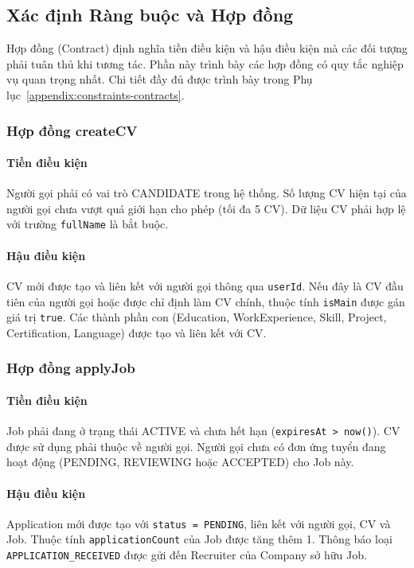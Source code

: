 \subsection{Xác định Ràng buộc và Hợp đồng}
\label{subsec:constraints-contracts}

Hợp đồng (Contract) định nghĩa tiền điều kiện và hậu điều kiện mà các đối tượng phải tuân thủ khi tương tác. Phần này trình bày các hợp đồng có quy tắc nghiệp vụ quan trọng nhất. Chi tiết đầy đủ được trình bày trong Phụ lục~\ref{appendix:constraints-contracts}.

\subsubsection{Hợp đồng createCV}

\paragraph{Tiền điều kiện}
Người gọi phải có vai trò CANDIDATE trong hệ thống. Số lượng CV hiện tại của người gọi chưa vượt quá giới hạn cho phép (tối đa 5 CV). Dữ liệu CV phải hợp lệ với trường \texttt{fullName} là bắt buộc.

\paragraph{Hậu điều kiện}
CV mới được tạo và liên kết với người gọi thông qua \texttt{userId}. Nếu đây là CV đầu tiên của người gọi hoặc được chỉ định làm CV chính, thuộc tính \texttt{isMain} được gán giá trị \texttt{true}. Các thành phần con (Education, WorkExperience, Skill, Project, Certification, Language) được tạo và liên kết với CV.

\subsubsection{Hợp đồng applyJob}

\paragraph{Tiền điều kiện}
Job phải đang ở trạng thái ACTIVE và chưa hết hạn (\texttt{expiresAt > now()}). CV được sử dụng phải thuộc về người gọi. Người gọi chưa có đơn ứng tuyển đang hoạt động (PENDING, REVIEWING hoặc ACCEPTED) cho Job này.

\paragraph{Hậu điều kiện}
Application mới được tạo với \texttt{status = PENDING}, liên kết với người gọi, CV và Job. Thuộc tính \texttt{applicationCount} của Job được tăng thêm 1. Thông báo loại \texttt{APPLICATION\_RECEIVED} được gửi đến Recruiter của Company sở hữu Job.

